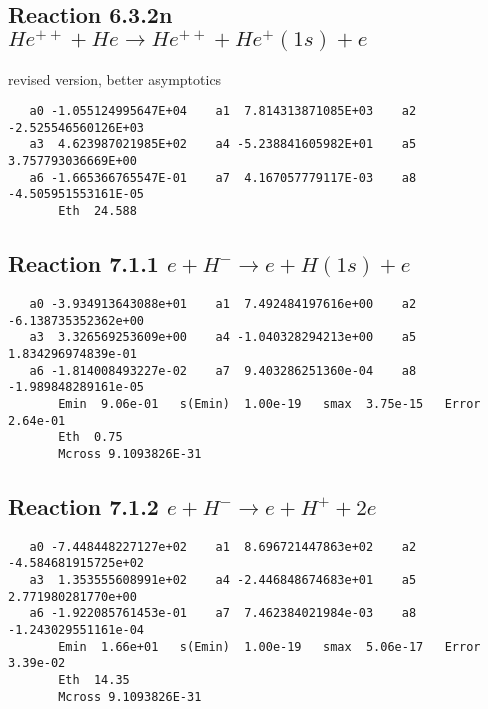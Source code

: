 \documentclass[12pt,dvipdfm]{article}
\begin{document}
\subsection{
Reaction 6.3.2n $   He^{++} + He \rightarrow He^{++} + He^+(1s) + e$}
revised version, better asymptotics

\begin{small}\begin{verbatim}
   a0 -1.055124995647E+04    a1  7.814313871085E+03    a2  -2.525546560126E+03
   a3  4.623987021985E+02    a4 -5.238841605982E+01    a5   3.757793036669E+00
   a6 -1.665366765547E-01    a7  4.167057779117E-03    a8  -4.505951553161E-05
       Eth  24.588
\end{verbatim}\end{small}


\newpage
\subsection{
Reaction 7.1.1 $   e + H^- \rightarrow e + H(1s) + e$}


\begin{small}\begin{verbatim}
   a0 -3.934913643088e+01    a1  7.492484197616e+00    a2 -6.138735352362e+00
   a3  3.326569253609e+00    a4 -1.040328294213e+00    a5  1.834296974839e-01
   a6 -1.814008493227e-02    a7  9.403286251360e-04    a8 -1.989848289161e-05
       Emin  9.06e-01   s(Emin)  1.00e-19   smax  3.75e-15   Error  2.64e-01
       Eth  0.75
       Mcross 9.1093826E-31
\end{verbatim}\end{small}

\newpage
\subsection{
Reaction 7.1.2 $   e + H^- \rightarrow e + H^+ + 2e$}


\begin{small}\begin{verbatim}
   a0 -7.448448227127e+02    a1  8.696721447863e+02    a2 -4.584681915725e+02
   a3  1.353555608991e+02    a4 -2.446848674683e+01    a5  2.771980281770e+00
   a6 -1.922085761453e-01    a7  7.462384021984e-03    a8 -1.243029551161e-04
       Emin  1.66e+01   s(Emin)  1.00e-19   smax  5.06e-17   Error  3.39e-02
       Eth  14.35
       Mcross 9.1093826E-31
\end{verbatim}\end{small}
\end{document}
